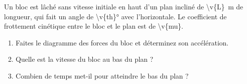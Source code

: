 Un bloc est lâché sans vitesse initiale en haut d'un plan incliné de \qty{\v{L}}{m} de longueur, qui fait un angle de \ang{\v{th}} avec l'horizontale. Le coefficient de frottement cinétique entre le bloc et le plan est de \num{\v{mu}}.

\begin{center}
\end{center}

\begin{enumerate}[label=\alph*)]
    \item Faites le diagramme des forces du bloc et déterminez son accélération.
    \item Quelle est la vitesse du bloc au bas du plan ?
    \item Combien de temps met-il pour atteindre le bas du plan ?
\end{enumerate}
